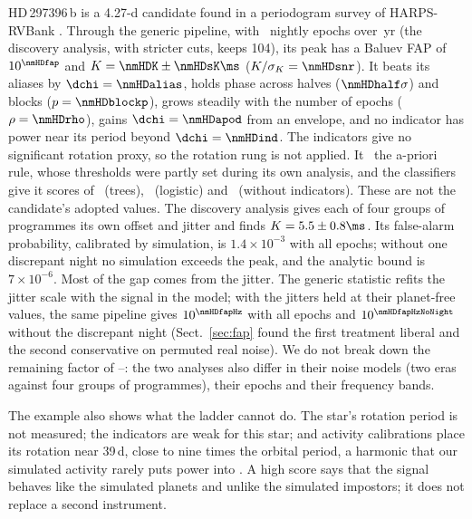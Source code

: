 HD\,297396\,b is a 4.27-d candidate found in a periodogram survey of HARPS-RVBank \citep{Fraser2026}. Through the generic pipeline, with \nmHDn\ nightly epochs over
\nmHDbase\,yr (the discovery analysis, with stricter cuts, keeps 104), its peak has a
Baluev FAP of $10^{\nmHDfap}$ and $K = \nmHDK \pm \nmHDsK\ms$ ($K/\sigma_K = \nmHDsnr$).
It beats its aliases by $\dchi = \nmHDalias$, holds phase across halves
($\nmHDhalf\sigma$) and blocks ($p = \nmHDblockp$), grows steadily with the number of
epochs ($\rho = \nmHDrho$), gains $\dchi = \nmHDapod$ from an envelope, and no indicator
has power near its period beyond $\dchi = \nmHDind$. The indicators give no significant
rotation proxy, so the rotation rung is not applied.
It \nmHDrule\ the a-priori rule, whose thresholds were partly set during its own
analysis, and the classifiers give it scores of \nmHDpTree\ (trees), \nmHDpLog\
(logistic) and \nmHDpNoInd\ (without indicators). These are not the candidate's adopted
values. The discovery analysis \citep{Fraser2026} gives each of four groups of
programmes its own offset and jitter and finds $K = 5.5 \pm 0.8\ms$. Its false-alarm
probability, calibrated by simulation, is $1.4\times10^{-3}$ with all epochs; without one
discrepant night no simulation exceeds the peak, and the analytic bound is $7\times10^{-6}$.
Most of the gap comes from the jitter. The generic statistic refits the jitter scale with
the signal in the model; with the jitters held at their planet-free values, the same
pipeline gives $10^{\nmHDfapHz}$ with all epochs and $10^{\nmHDfapHzNoNight}$ without the
discrepant night (Sect.~\ref{sec:fap} found the first treatment liberal and the second
conservative on permuted real noise). We do not break down the remaining factor of
\nmHDratioLo--\nmHDratioHi: the two analyses also differ in their noise models (two eras
against four groups of programmes), their epochs and their frequency bands.

The example also shows what the ladder cannot do. The star's rotation period is not
measured; the indicators are weak for this star; and activity calibrations place its
rotation near 39\,d, close to nine times the orbital period, a harmonic that our
simulated activity rarely puts power into \citep{Fraser2026}. A high score says
that the signal behaves like the simulated planets and unlike the simulated
impostors; it does not replace a second instrument.
